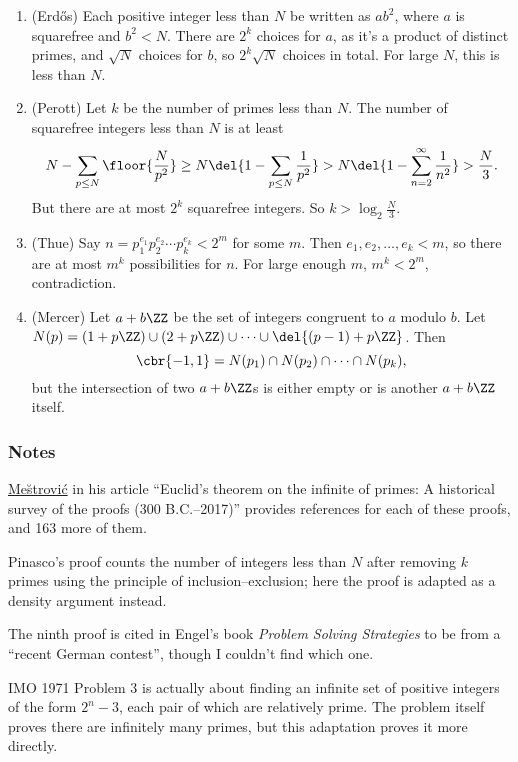 \documentclass[11pt,paper=letter]{scrartcl}
\begin{document}
\begin{enumerate}
\item (Erd\H{o}s) Each positive integer less than $N$ be written as $ab^2$, where $a$ is squarefree and $b^2 < N$. There are $2^k$ choices for $a$, as it's a product of distinct primes, and $\sqrt{N}$ choices for $b$, so $2^k\sqrt{N}$ choices in total. For large $N$, this is less than $N$.

\item (Perott) Let $k$ be the number of primes less than $N$. The number of squarefree integers less than $N$ is at least $$N - \sum_{p \le N} \floor{\frac{N}{p^2}} \ge N\del{1 - \sum_{p \le N} \frac{1}{p^2}} > N\del{1 - \sum_{n=2}^{\infty} \frac{1}{n^2}} > \frac{N}{3}.$$
But there are at most $2^k$ squarefree integers. So $k > \log_2 \frac{N}{3}$.

\item (Thue) Say $n = p_1^{e_1}p_2^{e_2}\cdots p_k^{e_k} < 2^m$ for some $m$. Then $e_1, e_2, \ldots, e_k < m$, so there are at most $m^k$ possibilities for $n$. For large enough $m$, $m^k < 2^m$, contradiction.

\item (Mercer) Let $a + b\ZZ$ be the set of integers congruent to $a$ modulo $b$. Let $N(p) = (1 + p\ZZ) \cup (2 + p\ZZ) \cup \cdots \cup \del{(p-1) + p\ZZ}$. Then
$$\cbr{-1, 1} = N(p_1) \cap N(p_2) \cap \cdots \cap N(p_k),$$
but the intersection of two $a + b \ZZ$s is either empty or is another $a + b \ZZ$ itself.

\end{enumerate}

\subsubsection*{Notes}

\href{https://arxiv.org/pdf/1202.3670.pdf}{Me\u{s}trovi\'c} in his article ``Euclid's theorem on the infinite of primes: A historical survey of the proofs (300 B.C.--2017)'' provides references for each of these proofs, and 163 more of them.

Pinasco's proof counts the number of integers less than $N$ after removing $k$ primes using the principle of inclusion--exclusion; here the proof is adapted as a density argument instead.

The ninth proof is cited in Engel's book \emph{Problem Solving Strategies} to be from a ``recent German contest'', though I couldn't find which one.

IMO 1971 Problem 3 is actually about finding an infinite set of positive integers of the form $2^n - 3$, each pair of which are relatively prime. The problem itself proves there are infinitely many primes, but this adaptation proves it more directly.
\end{document}

